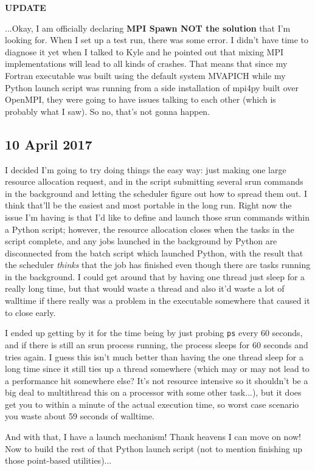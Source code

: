 \noindent\textbf{UPDATE}

...Okay, I am officially declaring \textbf{MPI Spawn NOT the solution} that I'm looking for. When I set up a test run, there was some error. I didn't have time to diagnose it yet when I talked to Kyle and he pointed out that mixing MPI implementations will lead to all kinds of crashes. That means that since my Fortran executable was built using the default system MVAPICH while my Python launch script was running from a side installation of mpi4py built over OpenMPI, they were going to have issues talking to each other (which is probably what I saw). So no, that's not gonna happen.

\subsection*{10 April 2017}
I decided I'm going to try doing things the easy way: just making one large resource allocation request, and in the script submitting several srun commands in the background and letting the scheduler figure out how to spread them out. I think that'll be the easiest and most portable in the long run. Right now the issue I'm having is that I'd like to define and launch those srun commands within a Python script; however, the resource allocation closes when the tasks in the script complete, and any jobs launched in the background by Python are disconnected from the batch script which launched Python, with the result that the scheduler \textit{thinks} that the job has finished even though there are tasks running in the background. I could get around that by having one thread just sleep for a really long time, but that would waste a thread and also it'd waste a lot of walltime if there really was a problem in the executable somewhere that caused it to close early.

I ended up getting by it for the time being by just probing \texttt{ps} every 60 seconds, and if there is still an srun process running, the process sleeps for 60 seconds and tries again. I guess this isn't much better than having the one thread sleep for a long time since it still ties up a thread somewhere (which may or may not lead to a performance hit somewhere else? It's not resource intensive so it shouldn't be a big deal to multithread this on a processor with some other task...), but it does get you to within a minute of the actual execution time, so worst case scenario you waste about 59 seconds of walltime.

And with that, I have a launch mechanism! Thank heavens I can move on now! Now to build the rest of that Python launch script (not to mention finishing up those point-based utilities)...

